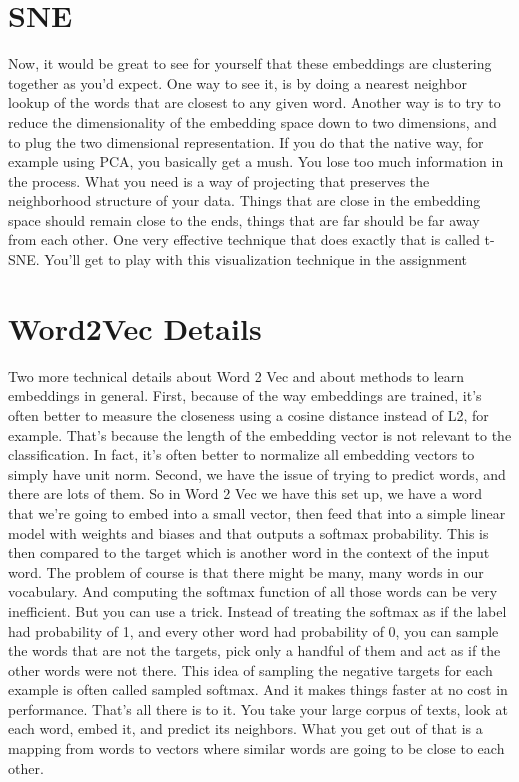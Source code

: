 \documentclass{article}
\begin{document}
\section{SNE}
Now, it would be great to see for
yourself that these embeddings
are clustering together as you'd expect.
One way to see it,
is by doing a nearest neighbor lookup
of the words that are closest
to any given word.
Another way is to try to reduce the
dimensionality of the embedding space
down to two dimensions, and to plug
the two dimensional representation.
If you do that the native way, for
example using PCA,
you basically get a mush.
You lose too much
information in the process.
What you need is a way of projecting
that preserves the neighborhood
structure of your data.
Things that are close in the embedding
space should remain close to the ends,
things that are far should
be far away from each other.
One very effective technique that
does exactly that is called t-SNE.
You'll get to play with this
visualization technique in
the assignment
\section{Word2Vec Details}
Two more technical details
about Word 2 Vec and
about methods to learn
embeddings in general.
First, because of the way embeddings are
trained, it's often better to measure
the closeness using a cosine
distance instead of L2, for example.
That's because the length
of the embedding vector
is not relevant to the classification.
In fact, it's often better to
normalize all embedding vectors
to simply have unit norm.
Second, we have the issue of
trying to predict words, and
there are lots of them.
So in Word 2 Vec we have this set up,
we have a word that we're going to embed
into a small vector, then feed that into
a simple linear model with weights and
biases and
that outputs a softmax probability.
This is then compared to the target
which is another word in the context
of the input word.
The problem of course is
that there might be many,
many words in our vocabulary.
And computing the softmax function of
all those words can be very inefficient.
But you can use a trick.
Instead of treating the softmax as
if the label had probability of 1,
and every other word
had probability of 0,
you can sample the words
that are not the targets,
pick only a handful of them and act
as if the other words were not there.
This idea of sampling
the negative targets for
each example is often
called sampled softmax.
And it makes things faster
at no cost in performance.
That's all there is to it.
You take your large corpus of texts,
look at each word, embed it, and
predict its neighbors.
What you get out of that is
a mapping from words to vectors
where similar words are going to
be close to each other.
\end{document}
